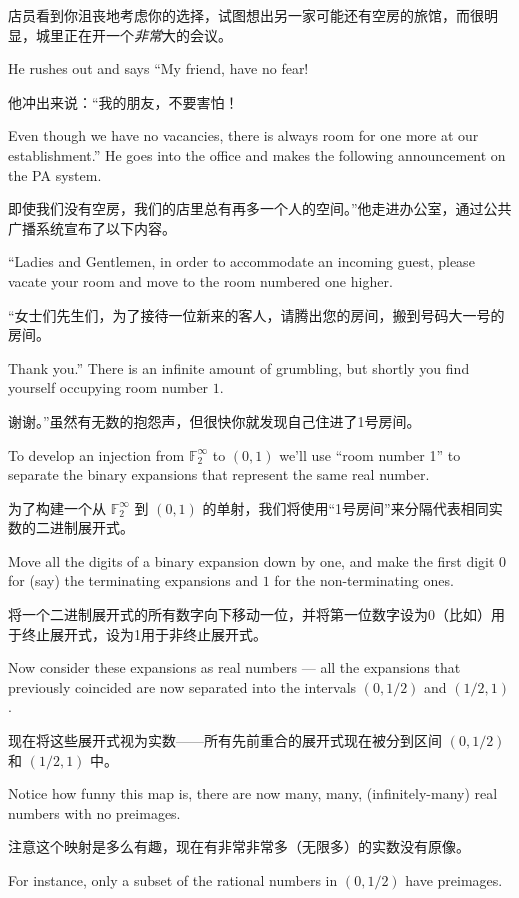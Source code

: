 店员看到你沮丧地考虑你的选择，试图想出另一家可能还有空房的旅馆，而很明显，城里正在开一个\emph{非常}大的会议。

He rushes out and says
``My friend, have no fear!

他冲出来说：“我的朋友，不要害怕！

Even though we have no vacancies,
there is always room for one more at our establishment.''
He goes into the office and makes the following announcement
on the PA system.

即使我们没有空房，我们的店里总有再多一个人的空间。”他走进办公室，通过公共广播系统宣布了以下内容。

``Ladies and Gentlemen, in order to accommodate
an incoming guest, please vacate your room and move to the room
numbered one higher.

“女士们先生们，为了接待一位新来的客人，请腾出您的房间，搬到号码大一号的房间。

Thank you.''  There
is an infinite amount of grumbling, but shortly you find yourself occupying
room number $1$.

谢谢。”虽然有无数的抱怨声，但很快你就发现自己住进了1号房间。

To develop an injection from ${\mathbb F}_2^\infty$ to $(0, 1)$ we'll use ``room number 1'' to
separate the binary expansions that represent the same real number.

为了构建一个从 ${\mathbb F}_2^\infty$ 到 $(0, 1)$ 的单射，我们将使用“1号房间”来分隔代表相同实数的二进制展开式。

Move
all the digits of a binary expansion down by one, and make the first digit
$0$ for (say) the terminating expansions and $1$ for the non-terminating ones.

将一个二进制展开式的所有数字向下移动一位，并将第一位数字设为0（比如）用于终止展开式，设为1用于非终止展开式。

Now consider these expansions as real numbers --- all the expansions that
previously coincided are now separated into the intervals $(0, 1/2)$ and
$(1/2, 1)$.

现在将这些展开式视为实数——所有先前重合的展开式现在被分到区间 $(0, 1/2)$ 和 $(1/2, 1)$ 中。

Notice how funny this map is, there are now
many, many, (infinitely-many)
real numbers with no preimages.

注意这个映射是多么有趣，现在有非常非常多（无限多）的实数没有原像。

For instance, only a subset of the rational
numbers in $(0, 1/2)$ have preimages.

